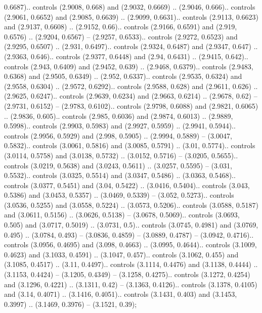 0.6687).. controls (2.9008, 0.668) and (2.9032, 0.6669) .. (2.9046, 0.666).. controls (2.9061, 0.6652) and (2.9085, 0.6639) .. (2.9099, 0.6631).. controls (2.9113, 0.6623) and (2.9137, 0.6608) .. (2.9152, 0.66).. controls (2.9166, 0.6591) and (2.919, 0.6576) .. (2.9204, 0.6567) -- (2.9257, 0.6533).. controls (2.9272, 0.6523) and (2.9295, 0.6507) .. (2.931, 0.6497).. controls (2.9324, 0.6487) and (2.9347, 0.647) .. (2.9363, 0.646).. controls (2.9377, 0.6448) and (2.94, 0.6431) .. (2.9415, 0.642).. controls (2.943, 0.6409) and (2.9452, 0.639) .. (2.9468, 0.6379).. controls (2.9483, 0.6368) and (2.9505, 0.6349) .. (2.952, 0.6337).. controls (2.9535, 0.6324) and (2.9558, 0.6304) .. (2.9572, 0.6292).. controls (2.9588, 0.628) and (2.9611, 0.626) .. (2.9625, 0.6247).. controls (2.9639, 0.6234) and (2.9663, 0.6214) .. (2.9678, 0.62) -- (2.9731, 0.6152) -- (2.9783, 0.6102).. controls (2.9798, 0.6088) and (2.9821, 0.6065) .. (2.9836, 0.605).. controls (2.985, 0.6036) and (2.9874, 0.6013) .. (2.9889, 0.5998).. controls (2.9903, 0.5983) and (2.9927, 0.5959) .. (2.9941, 0.5944).. controls (2.9956, 0.5929) and (2.998, 0.5905) .. (2.9994, 0.5889) -- (3.0047, 0.5832).. controls (3.0061, 0.5816) and (3.0085, 0.5791) .. (3.01, 0.5774).. controls (3.0114, 0.5758) and (3.0138, 0.5732) .. (3.0152, 0.5716) -- (3.0205, 0.5655).. controls (3.0219, 0.5638) and (3.0243, 0.5611) .. (3.0257, 0.5595) -- (3.031, 0.5532).. controls (3.0325, 0.5514) and (3.0347, 0.5486) .. (3.0363, 0.5468).. controls (3.0377, 0.5451) and (3.04, 0.5422) .. (3.0416, 0.5404).. controls (3.043, 0.5386) and (3.0453, 0.5357) .. (3.0469, 0.5339) -- (3.052, 0.5273).. controls (3.0536, 0.5255) and (3.0558, 0.5224) .. (3.0573, 0.5206).. controls (3.0588, 0.5187) and (3.0611, 0.5156) .. (3.0626, 0.5138) -- (3.0678, 0.5069).. controls (3.0693, 0.505) and (3.0717, 0.5019) .. (3.0731, 0.5).. controls (3.0745, 0.4981) and (3.0769, 0.495) .. (3.0784, 0.493) -- (3.0836, 0.4859) -- (3.0889, 0.4787) -- (3.0942, 0.4716).. controls (3.0956, 0.4695) and (3.098, 0.4663) .. (3.0995, 0.4644).. controls (3.1009, 0.4623) and (3.1033, 0.4591) .. (3.1047, 0.457).. controls (3.1062, 0.455) and (3.1085, 0.4517) .. (3.11, 0.4497).. controls (3.1114, 0.4476) and (3.1138, 0.4444) .. (3.1153, 0.4424) -- (3.1205, 0.4349) -- (3.1258, 0.4275).. controls (3.1272, 0.4254) and (3.1296, 0.4221) .. (3.1311, 0.42) -- (3.1363, 0.4126).. controls (3.1378, 0.4105) and (3.14, 0.4071) .. (3.1416, 0.4051).. controls (3.1431, 0.403) and (3.1453, 0.3997) .. (3.1469, 0.3976) -- (3.1521, 0.39);



